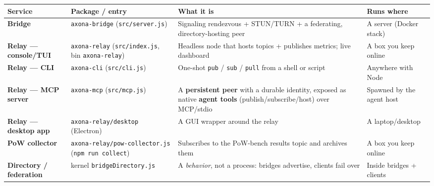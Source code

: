 \documentclass[
  nobib]{tufte-handout}
\newcounter{none} %
\begin{document}
{\def\LTcaptype{none} %
\begin{longtable}[]{@{}
  >{\raggedright\arraybackslash}p{}
  >{\raggedright\arraybackslash}p{}
  >{\raggedright\arraybackslash}p{}
  >{\raggedright\arraybackslash}p{}@{}}
\toprule\noalign{}
\begin{minipage}[b]{\linewidth}\raggedright
Service
\end{minipage} & \begin{minipage}[b]{\linewidth}\raggedright
Package / entry
\end{minipage} & \begin{minipage}[b]{\linewidth}\raggedright
What it is
\end{minipage} & \begin{minipage}[b]{\linewidth}\raggedright
Runs where
\end{minipage} \\
\midrule\noalign{}
\endhead
\bottomrule\noalign{}
\endlastfoot
\textbf{Bridge} & \texttt{axona-bridge} (\texttt{src/server.js}) &
Signaling rendezvous + STUN/TURN + a federating, directory-hosting peer
& A server (Docker stack) \\
\textbf{Relay --- console/TUI} & \texttt{axona-relay}
(\texttt{src/index.js}, bin \texttt{axona-relay}) & Headless node that
hosts topics + publishes metrics; live dashboard & A box you keep
online \\
\textbf{Relay --- CLI} & \texttt{axona-cli} (\texttt{src/cli.js}) &
One-shot \texttt{pub} / \texttt{sub} / \texttt{pull} from a shell or
script & Anywhere with Node \\
\textbf{Relay --- MCP server} & \texttt{axona-mcp} (\texttt{src/mcp.js})
& A \textbf{persistent peer} with a durable identity, exposed as native
\textbf{agent tools} (publish/subscribe/host) over MCP/stdio & Spawned
by the agent host \\
\textbf{Relay --- desktop app} & \texttt{axona-relay/desktop} (Electron)
& A GUI wrapper around the relay & A laptop/desktop \\
\textbf{PoW collector} & \texttt{axona-relay/pow-collector.js}
(\texttt{npm\ run\ collect}) & Subscribes to the PoW-bench results topic
and archives them & A box you keep online \\
\textbf{Directory / federation} & kernel \texttt{bridgeDirectory.js} & A
\emph{behavior}, not a process: bridges advertise, clients fail over &
Inside bridges + clients \\
\end{longtable}
}
\end{document}
